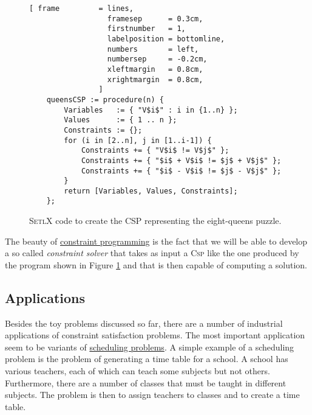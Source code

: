 \begin{figure}[!ht]
\centering
\begin{Verbatim}[ frame         = lines, 
                  framesep      = 0.3cm, 
                  firstnumber   = 1,
                  labelposition = bottomline,
                  numbers       = left,
                  numbersep     = -0.2cm,
                  xleftmargin   = 0.8cm,
                  xrightmargin  = 0.8cm,
                ]
    queensCSP := procedure(n) {
        Variables   := { "V$i$" : i in {1..n} };
        Values      := { 1 .. n };
        Constraints := {};
        for (i in [2..n], j in [1..i-1]) {
            Constraints += { "V$i$ != V$j$" };
            Constraints += { "$i$ + V$i$ != $j$ + V$j$" };
            Constraints += { "$i$ - V$i$ != $j$ - V$j$" };
        }
        return [Variables, Values, Constraints];
    };
\end{Verbatim}
\vspace*{-0.3cm}
\caption{\textsc{SetlX} code to create the CSP representing the eight-queens puzzle.}
\label{fig:queens-csp.stlx}
\end{figure}

The beauty of \href{https://en.wikipedia.org/wiki/Constraint_programming}{constraint programming} is the fact
that we will be able to develop a so called \emph{\color{blue}constraint solver} that takes as input a \textsc{Csp}
like the one produced by the program shown in Figure \ref{fig:queens-csp.stlx} and that is then capable of
computing a solution. 

\subsection{Applications}
Besides the toy problems discussed so far, there are a number of industrial applications of constraint
satisfaction problems.  The most important application seem to be variants of
\href{https://en.wikipedia.org/wiki/Scheduling_(production_processes)}{scheduling problems}. 
A simple example of a scheduling problem is the problem of generating a time table for a school.  A school has
various teachers, each of which can teach some subjects but not others.  Furthermore, there are a number of
classes that must be taught in different subjects.  The problem is then to assign teachers to classes and to
create a time table.


